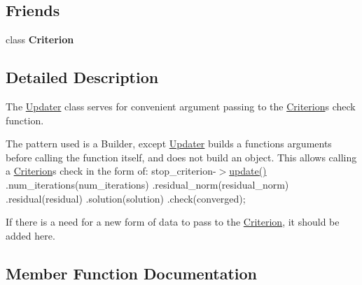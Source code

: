 \subsection*{Friends}
\begin{DoxyCompactItemize}
\item 
\mbox{\label{classgko_1_1stop_1_1Criterion_1_1Updater_a2dbeac1289f0ae8fdee9cc7bad70e656}} 
class {\bfseries Criterion}
\end{DoxyCompactItemize}


\subsection{Detailed Description}
The \hyperlink{classgko_1_1stop_1_1Criterion_1_1Updater}{Updater} class serves for convenient argument passing to the \hyperlink{classgko_1_1stop_1_1Criterion}{Criterion}\textquotesingle{}s check function. 

The pattern used is a Builder, except \hyperlink{classgko_1_1stop_1_1Criterion_1_1Updater}{Updater} builds a function\textquotesingle{}s arguments before calling the function itself, and does not build an object. This allows calling a \hyperlink{classgko_1_1stop_1_1Criterion}{Criterion}\textquotesingle{}s check in the form of\+: stop\+\_\+criterion-\/$>$\hyperlink{classgko_1_1stop_1_1Criterion_a47e22c46eaa742d709dcbf0d26d93e6c}{update()} .num\+\_\+iterations(num\+\_\+iterations) .residual\+\_\+norm(residual\+\_\+norm) .residual(residual) .solution(solution) .check(converged);

If there is a need for a new form of data to pass to the \hyperlink{classgko_1_1stop_1_1Criterion}{Criterion}, it should be added here. 

\subsection{Member Function Documentation}
\mbox{\label{classgko_1_1stop_1_1Criterion_1_1Updater_a45c08cadb75dbab3af4f52ce0684714d}} 
